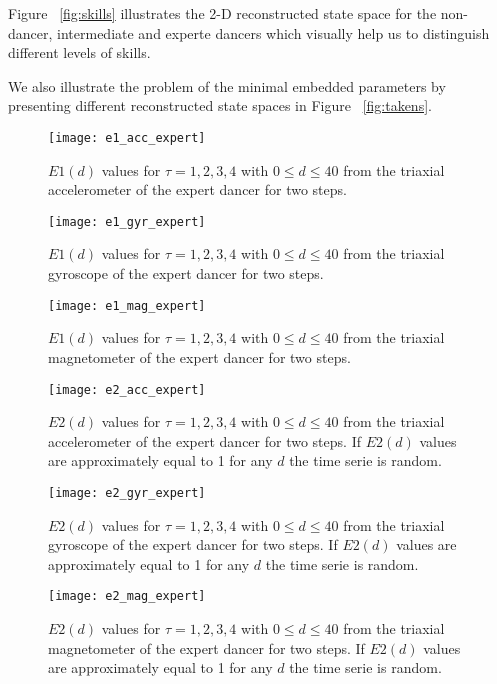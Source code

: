 \documentclass{sigchi}
\begin{document}
Figure ~\ref{fig:skills} illustrates the 2-D reconstructed state space
for the non-dancer, intermediate and experte dancers which visually help us to
distinguish different levels of skills.

We also illustrate the problem of the minimal embedded parameters by 
presenting different reconstructed state spaces in Figure ~\ref{fig:takens}.


  \begin{figure}[htbp!] 
  \centering    
  \texttt{[image: e1\_acc\_expert]}
  \caption[PA]{$E1(d)$ values for $\tau=1,2,3,4$ with $0 \leq d \leq 40$
  from the triaxial accelerometer of the expert dancer for two steps.}
  \label{fig:e1acc}
  \end{figure}
  

    \begin{figure}[htbp!] 
  \centering    
  \texttt{[image: e1\_gyr\_expert]}
  \caption[PA]{$E1(d)$ values for $\tau=1,2,3,4$ with $0 \leq d \leq 40$
  from the triaxial gyroscope of the expert dancer for two steps.}
  \label{fig:e1gyr}
  \end{figure}
  
    \begin{figure}[htbp!] 
  \centering    
  \texttt{[image: e1\_mag\_expert]}
  \caption[PA]{$E1(d)$ values for $\tau=1,2,3,4$ with $0 \leq d \leq 40$
  from the triaxial magnetometer of the expert dancer for two steps.}
  \label{fig:e1mag}
  \end{figure}
  
  \begin{figure}[htbp!] 
  \centering    
  \texttt{[image: e2\_acc\_expert]}
  \caption[PA]{$E2(d)$ values for $\tau=1,2,3,4$ with $0 \leq d \leq40 $
  from the triaxial accelerometer of the expert dancer for two steps.
  If $E2(d)$ values are approximately equal to 1 for any $d$ the time serie is random.
  }
  \label{fig:e2acc}
  \end{figure}
  

    \begin{figure}[htbp!] 
  \centering    
  \texttt{[image: e2\_gyr\_expert]}
  \caption[PA]{$E2(d)$ values for $\tau=1,2,3,4$ with $0 \leq d \leq40 $
  from the triaxial gyroscope of the expert dancer for two steps.
  If $E2(d)$ values are approximately equal to 1 for any $d$ the time serie is random.
  }
  \label{fig:e2gyr}
  \end{figure}
  
    \begin{figure}[htbp!] 
  \centering    
  \texttt{[image: e2\_mag\_expert]}
  \caption[PA]{$E2(d)$ values for $\tau=1,2,3,4$ with $0 \leq d \leq40 $
  from the triaxial magnetometer of the expert dancer for two steps.
  If $E2(d)$ values are approximately equal to 1 for any $d$ the time serie is random.
  }
  \label{fig:e2mag}
  \end{figure}
\end{document}
